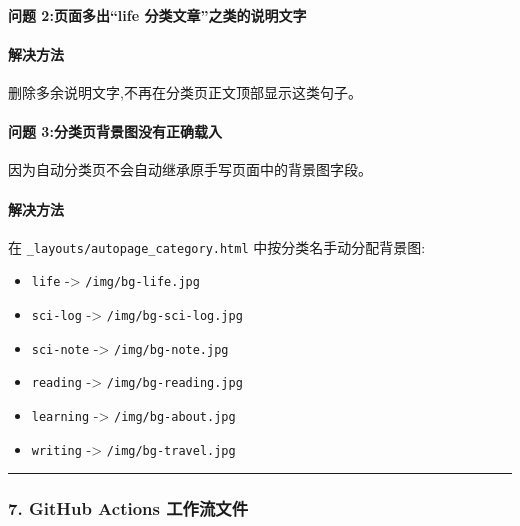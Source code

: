 \documentclass[lang=cn,scheme=chinese,color=blue,device=normal,toc=onecol,math=cm]{elegantbook}
\begin{document}
\paragraph{问题 2:页面多出“life 分类文章”之类的说明文字}


\paragraph{解决方法}


删除多余说明文字,不再在分类页正文顶部显示这类句子。\par


\paragraph{问题 3:分类页背景图没有正确载入}


因为自动分类页不会自动继承原手写页面中的背景图字段。\par


\paragraph{解决方法}


在 \texttt{\_\allowbreak{}layouts/\allowbreak{}autopage\_\allowbreak{}category.html} 中按分类名手动分配背景图:\par


\begin{itemize}
\item \texttt{life} -> \texttt{/\allowbreak{}img/\allowbreak{}bg-life.jpg}
\item \texttt{sci-log} -> \texttt{/\allowbreak{}img/\allowbreak{}bg-sci-log.jpg}
\item \texttt{sci-note} -> \texttt{/\allowbreak{}img/\allowbreak{}bg-note.jpg}
\item \texttt{reading} -> \texttt{/\allowbreak{}img/\allowbreak{}bg-reading.jpg}
\item \texttt{learning} -> \texttt{/\allowbreak{}img/\allowbreak{}bg-about.jpg}
\item \texttt{writing} -> \texttt{/\allowbreak{}img/\allowbreak{}bg-travel.jpg}
\end{itemize}


\medskip\hrule\medskip


\subsubsection{7. GitHub Actions 工作流文件}
\end{document}
